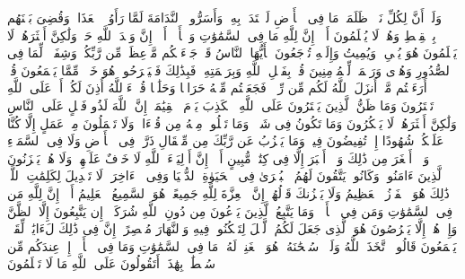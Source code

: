\stopbuffer
\startbuffer[\q:10:54]
وَلَوۡ أَنَّ لِكُلِّ نَفۡسࣲ ظَلَمَتۡ مَا فِی ٱلۡأَرۡضِ لَٱفۡتَدَتۡ بِهِۦۗ وَأَسَرُّوا۟ ٱلنَّدَامَةَ لَمَّا رَأَوُا۟ ٱلۡعَذَابَۖ وَقُضِیَ بَیۡنَهُم بِٱلۡقِسۡطِ وَهُمۡ لَا یُظۡلَمُونَ%
\stopbuffer
\startbuffer[\q:10:55]
أَلَاۤ إِنَّ لِلَّهِ مَا فِی ٱلسَّمَٰوَٰتِ وَٱلۡأَرۡضِۗ أَلَاۤ إِنَّ وَعۡدَ ٱللَّهِ حَقࣱّ وَلَٰكِنَّ أَكۡثَرَهُمۡ لَا یَعۡلَمُونَ%
\stopbuffer
\startbuffer[\q:10:56]
هُوَ یُحۡیِۦ وَیُمِیتُ وَإِلَیۡهِ تُرۡجَعُونَ%
\stopbuffer
\startbuffer[\q:10:57]
یَٰۤأَیُّهَا ٱلنَّاسُ قَدۡ جَاۤءَتۡكُم مَّوۡعِظَةࣱ مِّن رَّبِّكُمۡ وَشِفَاۤءࣱ لِّمَا فِی ٱلصُّدُورِ وَهُدࣰى وَرَحۡمَةࣱ لِّلۡمُؤۡمِنِینَ%
\stopbuffer
\startbuffer[\q:10:58]
قُلۡ بِفَضۡلِ ٱللَّهِ وَبِرَحۡمَتِهِۦ فَبِذَٰلِكَ فَلۡیَفۡرَحُوا۟ هُوَ خَیۡرࣱ مِّمَّا یَجۡمَعُونَ%
\stopbuffer
\startbuffer[\q:10:59]
قُلۡ أَرَءَیۡتُم مَّاۤ أَنزَلَ ٱللَّهُ لَكُم مِّن رِّزۡقࣲ فَجَعَلۡتُم مِّنۡهُ حَرَامࣰا وَحَلَٰلࣰا قُلۡ ءَاۤللَّهُ أَذِنَ لَكُمۡۖ أَمۡ عَلَى ٱللَّهِ تَفۡتَرُونَ%
\stopbuffer
\startbuffer[\q:10:60]
وَمَا ظَنُّ ٱلَّذِینَ یَفۡتَرُونَ عَلَى ٱللَّهِ ٱلۡكَذِبَ یَوۡمَ ٱلۡقِیَٰمَةِۗ إِنَّ ٱللَّهَ لَذُو فَضۡلٍ عَلَى ٱلنَّاسِ وَلَٰكِنَّ أَكۡثَرَهُمۡ لَا یَشۡكُرُونَ%
\stopbuffer
\startbuffer[\q:10:61]
وَمَا تَكُونُ فِی شَأۡنࣲ وَمَا تَتۡلُوا۟ مِنۡهُ مِن قُرۡءَانࣲ وَلَا تَعۡمَلُونَ مِنۡ عَمَلٍ إِلَّا كُنَّا عَلَیۡكُمۡ شُهُودًا إِذۡ تُفِیضُونَ فِیهِۚ وَمَا یَعۡزُبُ عَن رَّبِّكَ مِن مِّثۡقَالِ ذَرَّةࣲ فِی ٱلۡأَرۡضِ وَلَا فِی ٱلسَّمَاۤءِ وَلَاۤ أَصۡغَرَ مِن ذَٰلِكَ وَلَاۤ أَكۡبَرَ إِلَّا فِی كِتَٰبࣲ مُّبِینٍ%
\stopbuffer
\startbuffer[\q:10:62]
أَلَاۤ إِنَّ أَوۡلِیَاۤءَ ٱللَّهِ لَا خَوۡفٌ عَلَیۡهِمۡ وَلَا هُمۡ یَحۡزَنُونَ%
\stopbuffer
\startbuffer[\q:10:63]
ٱلَّذِینَ ءَامَنُوا۟ وَكَانُوا۟ یَتَّقُونَ%
\stopbuffer
\startbuffer[\q:10:64]
لَهُمُ ٱلۡبُشۡرَىٰ فِی ٱلۡحَیَوٰةِ ٱلدُّنۡیَا وَفِی ٱلۡءَاخِرَةِۚ لَا تَبۡدِیلَ لِكَلِمَٰتِ ٱللَّهِۚ ذَٰلِكَ هُوَ ٱلۡفَوۡزُ ٱلۡعَظِیمُ%
\stopbuffer
\startbuffer[\q:10:65]
وَلَا یَحۡزُنكَ قَوۡلُهُمۡۘ إِنَّ ٱلۡعِزَّةَ لِلَّهِ جَمِیعًاۚ هُوَ ٱلسَّمِیعُ ٱلۡعَلِیمُ%
\stopbuffer
\startbuffer[\q:10:66]
أَلَاۤ إِنَّ لِلَّهِ مَن فِی ٱلسَّمَٰوَٰتِ وَمَن فِی ٱلۡأَرۡضِۗ وَمَا یَتَّبِعُ ٱلَّذِینَ یَدۡعُونَ مِن دُونِ ٱللَّهِ شُرَكَاۤءَۚ إِن یَتَّبِعُونَ إِلَّا ٱلظَّنَّ وَإِنۡ هُمۡ إِلَّا یَخۡرُصُونَ%
\stopbuffer
\startbuffer[\q:10:67]
هُوَ ٱلَّذِی جَعَلَ لَكُمُ ٱلَّیۡلَ لِتَسۡكُنُوا۟ فِیهِ وَٱلنَّهَارَ مُبۡصِرًاۚ إِنَّ فِی ذَٰلِكَ لَءَایَٰتࣲ لِّقَوۡمࣲ یَسۡمَعُونَ%
\stopbuffer
\startbuffer[\q:10:68]
قَالُوا۟ ٱتَّخَذَ ٱللَّهُ وَلَدࣰاۗ سُبۡحَٰنَهُۥۖ هُوَ ٱلۡغَنِیُّۖ لَهُۥ مَا فِی ٱلسَّمَٰوَٰتِ وَمَا فِی ٱلۡأَرۡضِۚ إِنۡ عِندَكُم مِّن سُلۡطَٰنِۭ بِهَٰذَاۤۚ أَتَقُولُونَ عَلَى ٱللَّهِ مَا لَا تَعۡلَمُونَ%
